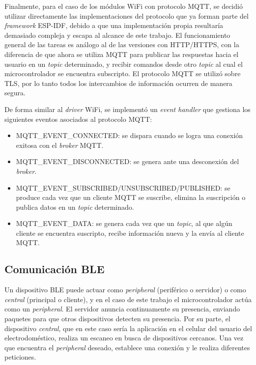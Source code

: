 Finalmente, para el caso de los módulos WiFi con protocolo MQTT, se decidió utilizar directamente las implementaciones del protocolo que ya forman parte del \emph{framework} ESP-IDF, debido a que una implementación propia resultaría demasiado compleja y escapa al alcance de este trabajo. El funcionamiento general de las tareas es análogo al de las versiones con HTTP/HTTPS, con la diferencia de que ahora se utiliza MQTT para publicar las respuestas hacia el usuario en un \emph{topic} determinado, y recibir comandos desde otro \emph{topic} al cual el microcontrolador se encuentra subscripto. El protocolo MQTT se utilizó sobre TLS, por lo tanto todos los intercambios de información ocurren de manera segura.

De forma similar al \emph{driver} WiFi, se implementó un \emph{event handler} que gestiona los siguientes eventos asociados al protocolo MQTT:

\begin{itemize}
	\item MQTT\_EVENT\_CONNECTED: se dispara cuando se logra una conexión exitosa con el \emph{broker} MQTT.
	\item MQTT\_EVENT\_DISCONNECTED: se genera ante una desconexión del \emph{broker}.
	\item MQTT\_EVENT\_SUBSCRIBED/UNSUBSCRIBED/PUBLISHED: se produce cada vez que un cliente MQTT se suscribe, elimina la suscripción o publica datos en un \emph{topic} determinado.
	\item MQTT\_EVENT\_DATA: se genera cada vez que un \emph{topic}, al que algún cliente se encuentra suscripto, recibe información nueva y la envía al cliente MQTT.
\end{itemize} 


\subsection{Comunicación BLE}

Un dispositivo BLE puede actuar como \emph{peripheral} (periférico o servidor) o como \emph{central} (principal o cliente), y en el caso de este trabajo el microcontrolador actúa como un \emph{peripheral}. El servidor anuncia continuamente su presencia, enviando paquetes para que otros dispositivos detecten su presencia. Por su parte, el dispositivo \emph{central}, que en este caso sería la aplicación en el celular del usuario del electrodoméstico, realiza un escaneo en busca de dispositivos cercanos. Una vez que encuentra el \emph{peripheral} deseado, establece una conexión y le realiza diferentes peticiones.

